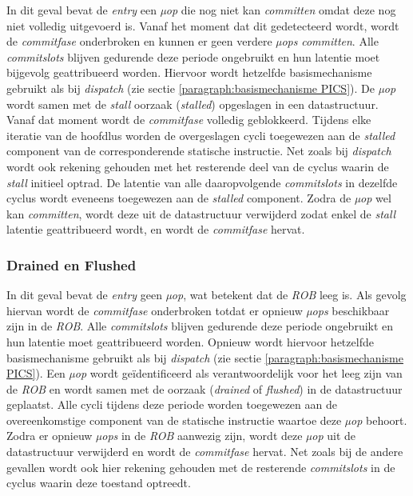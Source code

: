\documentclass[12pt,a4paper,faculty=ea,language=nl]{ugent-doc}
\begin{document}
In dit geval bevat de \textit{entry} een \textit{µop} die nog niet kan \textit{committen} omdat deze nog niet volledig uitgevoerd is.
Vanaf het moment dat dit gedetecteerd wordt, wordt de \textit{commitfase} onderbroken en kunnen er geen verdere \textit{µops} \textit{committen}.
Alle \textit{commitslots} blijven gedurende deze periode ongebruikt en hun latentie moet bijgevolg geattribueerd worden.
Hiervoor wordt hetzelfde basismechanisme gebruikt als bij \textit{dispatch} (zie sectie \ref{paragraph:basismechanisme PICS}).
De \textit{µop} wordt samen met de \textit{stall} oorzaak (\textit{stalled}) opgeslagen in een datastructuur. Vanaf dat moment wordt de \textit{commitfase} volledig geblokkeerd.
Tijdens elke iteratie van de hoofdlus worden de overgeslagen cycli toegewezen aan de \textit{stalled} component van de corresponderende statische instructie.
Net zoals bij \textit{dispatch} wordt ook rekening gehouden met het resterende deel van de cyclus waarin de \textit{stall} initieel optrad. De latentie van alle daaropvolgende \textit{commitslots} in dezelfde cyclus wordt eveneens toegewezen aan de \textit{stalled} component.
Zodra de \textit{µop} wel kan \textit{committen}, wordt deze uit de datastructuur verwijderd zodat enkel de \textit{stall} latentie geattribueerd wordt, en wordt de \textit{commitfase} hervat.

\subsubsection{Drained en Flushed}

In dit geval bevat de \textit{entry} geen \textit{µop}, wat betekent dat de \textit{ROB} leeg is.
Als gevolg hiervan wordt de \textit{commitfase} onderbroken totdat er opnieuw \textit{µops} beschikbaar zijn in de \textit{ROB}.
Alle \textit{commitslots} blijven gedurende deze periode ongebruikt en hun latentie moet geattribueerd worden.
Opnieuw wordt hiervoor hetzelfde basismechanisme gebruikt als bij \textit{dispatch} (zie sectie \ref{paragraph:basismechanisme PICS}).
Een \textit{µop} wordt geïdentificeerd als verantwoordelijk voor het leeg zijn van de \textit{ROB} en wordt samen met de oorzaak (\textit{drained} of \textit{flushed}) in de datastructuur geplaatst.
Alle cycli tijdens deze periode worden toegewezen aan de overeenkomstige component van de statische instructie waartoe deze \textit{µop} behoort.
Zodra er opnieuw \textit{µops} in de \textit{ROB} aanwezig zijn, wordt deze \textit{µop} uit de datastructuur verwijderd en wordt de \textit{commitfase} hervat.
Net zoals bij de andere gevallen wordt ook hier rekening gehouden met de resterende \textit{commitslots} in de cyclus waarin deze toestand optreedt.
\end{document}
